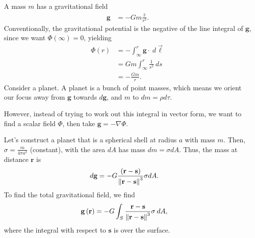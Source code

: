 \documentclass[10pt]{mypackage}
\begin{document}
\begin{example}[Gravity]
  A mass $m$ has a gravitational field
  \begin{align*}
    \mathbf{g} &= -Gm\frac{\widehat{r}}{r^2}.
  \end{align*}
  Conventionally, the gravitational potential is the negative of the line integral of $\mathbf{g}$, since we want $\Phi\left(\infty\right) = 0$, yielding
  \begin{align*}
    \Phi\left(r\right) &= -\int_{\infty}^{r} \mathbf{g}\cdot\:d\vec{\ell}\\
                       &= Gm\int_{\infty}^{r} \frac{1}{s^2}\:ds\\
                       &= -\frac{Gm}{r}.
  \end{align*}
  Consider a planet. A planet is a bunch of point masses, which means we orient our focus away from $\mathbf{g}$ towards $d\mathbf{g}$, and $m$ to $dm = \rho d\tau$.\newline

  However, instead of trying to work out this integral in vector form, we want to find a scalar field $\Phi$, then take $\mathbf{g} = -\nabla \Phi$.\newline

  Let's construct a planet that is a spherical shell at radius $a$ with mass $m$. Then, $\sigma = \frac{m}{4\pi a^2}$ (constant), with the area $dA$ has mass $dm = \sigma dA$. Thus, the mass at distance $\mathbf{r}$ is
  \begin{align*}
    d\mathbf{g} &= -G\frac{\left(\mathbf{r} - \mathbf{s}\right)}{\norm{\mathbf{r} - \mathbf{s}}^3} \sigma dA.
  \end{align*}
  To find the total gravitational field, we find
  \begin{align*}
    \mathbf{g}\left(\mathbf{r}\right) &= -G\int_{S}^{} \frac{\mathbf{r} - \mathbf{s}}{\norm{\mathbf{r} - \mathbf{s}}^3}\sigma\:dA,
  \end{align*}
  where the integral with respect to $\mathbf{s}$ is over the surface.\newline


\end{example}
\end{document}

